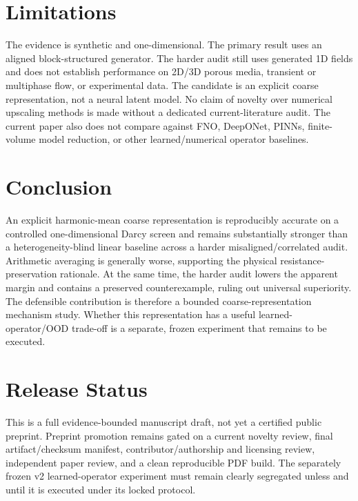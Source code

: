 \documentclass[10pt]{article}
\begin{document}
\section{Limitations}
The evidence is synthetic and one-dimensional. The primary result uses an aligned block-structured generator. The harder audit still uses generated 1D fields and does not establish performance on 2D/3D porous media, transient or multiphase flow, or experimental data. The candidate is an explicit coarse representation, not a neural latent model. No claim of novelty over numerical upscaling methods is made without a dedicated current-literature audit. The current paper also does not compare against FNO, DeepONet, PINNs, finite-volume model reduction, or other learned/numerical operator baselines.

\section{Conclusion}
An explicit harmonic-mean coarse representation is reproducibly accurate on a controlled one-dimensional Darcy screen and remains substantially stronger than a heterogeneity-blind linear baseline across a harder misaligned/correlated audit. Arithmetic averaging is generally worse, supporting the physical resistance-preservation rationale. At the same time, the harder audit lowers the apparent margin and contains a preserved counterexample, ruling out universal superiority. The defensible contribution is therefore a bounded coarse-representation mechanism study. Whether this representation has a useful learned-operator/OOD trade-off is a separate, frozen experiment that remains to be executed.

\section*{Release Status}
This is a full evidence-bounded manuscript draft, not yet a certified public preprint. Preprint promotion remains gated on a current novelty review, final artifact/checksum manifest, contributor/authorship and licensing review, independent paper review, and a clean reproducible PDF build. The separately frozen v2 learned-operator experiment must remain clearly segregated unless and until it is executed under its locked protocol.



\end{document}
